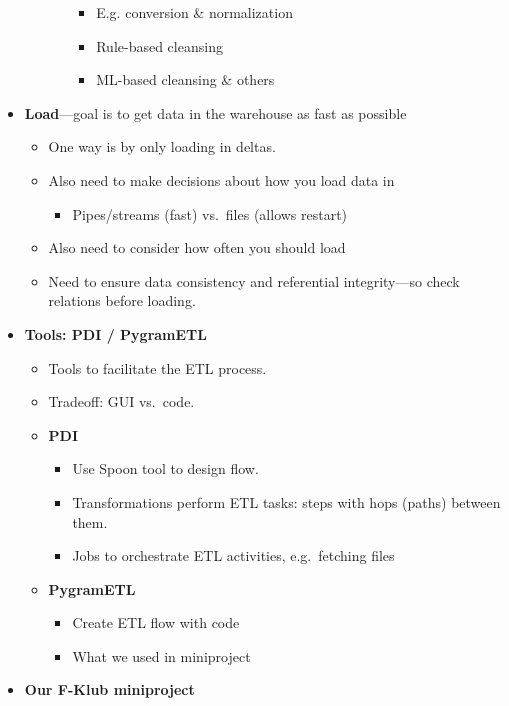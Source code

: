 \begin{multicols}{2}
\begin{itemize}
\begin{itemize}
\begin{itemize}
      \begin{itemize}
            \item
        E.g. conversion \& normalization
      \item
        Rule-based cleansing
      \item
        ML-based cleansing \& others
      \end{itemize}
    \end{itemize}
  \end{itemize}
\item
  \textbf{Load}---goal is to get data in the warehouse as fast as
  possible

  \begin{itemize}
    \item
    One way is by only loading in deltas.
  \item
    Also need to make decisions about how you load data in

    \begin{itemize}
        \item
      Pipes/streams (fast) vs.~files (allows restart)
    \end{itemize}
  \item
    Also need to consider how often you should load
  \item
    Need to ensure data consistency and referential integrity---so check
    relations before loading.
  \end{itemize}
\item
  \textbf{Tools: PDI / PygramETL}

  \begin{itemize}
    \item
    Tools to facilitate the ETL process.
  \item
    Tradeoff: GUI vs.~code.
  \item
    \textbf{PDI}

    \begin{itemize}
        \item
      Use Spoon tool to design flow.
    \item
      Transformations perform ETL tasks: steps with hops (paths) between
      them.
    \item
      Jobs to orchestrate ETL activities, e.g.~fetching files
    \end{itemize}
  \item
    \textbf{PygramETL}

    \begin{itemize}
        \item
      Create ETL flow with code
    \item
      What we used in miniproject
    \end{itemize}
  \end{itemize}
\item
  \textbf{Our F-Klub miniproject}


\end{itemize}
\end{multicols}
